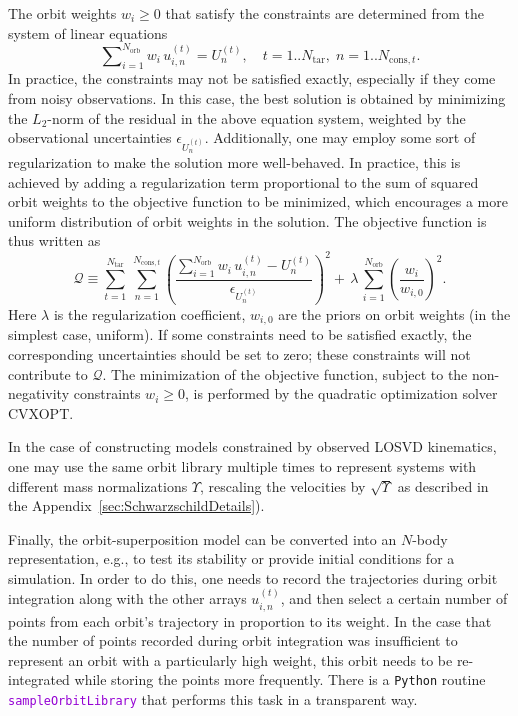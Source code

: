 \documentclass[12pt]{article}
\newcommand{\Python}{\texttt{Python}\xspace}
\newcommand{\ttt}[1]{\textcolor{darkviolet}{\texttt{#1}}}
\begin{document}
The orbit weights $w_i\ge 0$ that satisfy the constraints are determined from the system of linear equations
\begin{equation*}
\sum\nolimits_{i=1}^{N_\mathrm{orb}} w_i\, u_{i,n}^{(t)} = U_n^{(t)},\quad
t=1..N_\mathrm{tar}, \; n=1..N_{\mathrm{cons},t} .
\end{equation*}
In practice, the constraints may not be satisfied exactly, especially if they come from noisy observations. In this case, the best solution is obtained by minimizing the $L_2$-norm of the residual in the above equation system, weighted by the observational uncertainties $\epsilon_{U_n^{(t)}}$. Additionally, one may employ some sort of regularization to make the solution more well-behaved. In practice, this is achieved by adding a regularization term proportional to the sum of squared orbit weights to the objective function to be minimized, which encourages a more uniform distribution of orbit weights in the solution. The objective function is thus written as
\begin{equation*}
\mathcal Q \equiv \sum_{t=1}^{N_\mathrm{tar}}\, \sum_{n=1}^{N_{\mathrm{cons},t}} 
\left(
\frac{ \sum_{i=1}^{N_\mathrm{orb}} w_i\, u_{i,n}^{(t)} - U_n^{(t)} }{ \epsilon_{U_n^{(t)}} }
\right)^2 +\,
\lambda\,\sum_{i=1}^{N_\mathrm{orb}} \left(\frac{w_i}{w_{i,0}}\right)^2.
\end{equation*}
Here $\lambda$ is the regularization coefficient, $w_{i,0}$ are the priors on orbit weights (in the simplest case, uniform). If some constraints need to be satisfied exactly, the corresponding uncertainties should be set to zero; these constraints will not contribute to $\mathcal Q$. The minimization of the objective function, subject to the non-negativity constraints $w_i\ge 0$, is performed by the quadratic optimization solver CVXOPT.

In the case of constructing models constrained by observed LOSVD kinematics, one may use the same orbit library multiple times to represent systems with different mass normalizations $\Upsilon$, rescaling the velocities by $\sqrt{\Upsilon}$ as described in the Appendix~\ref{sec:SchwarzschildDetails}).

Finally, the orbit-superposition model can be converted into an $N$-body representation, e.g., to test its stability or provide initial conditions for a simulation. In order to do this, one needs to record the trajectories during orbit integration along with the other arrays $u_{i,n}^{(t)}$, and then select a certain number of points from each orbit's trajectory in proportion to its weight. In the case that the number of points recorded during orbit integration was insufficient to represent an orbit with a particularly high weight, this orbit needs to be re-integrated while storing the points more frequently. There is a \Python routine \ttt{sampleOrbitLibrary} that performs this task in a transparent way.
\end{document}

